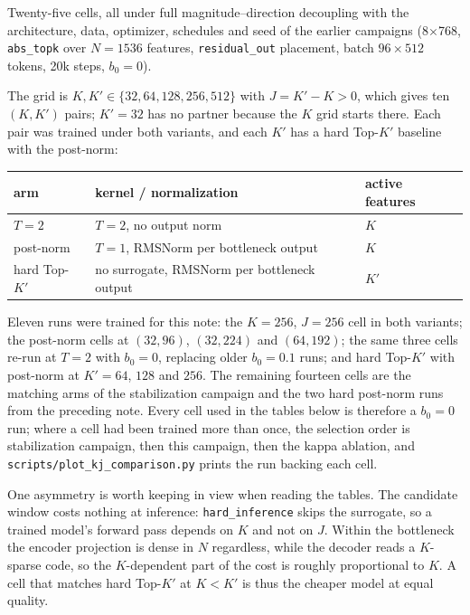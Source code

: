 \documentclass[11pt,a4paper]{article}
\newcommand{\code}[1]{\texttt{#1}}
\newcommand{\Kp}{K'}
\begin{document}
Twenty-five cells, all under full magnitude--direction decoupling with the
architecture, data, optimizer, schedules and seed of the earlier campaigns
(8$\times$768, \code{abs\_topk} over $N=1536$ features, \code{residual\_out}
placement, batch $96\times512$ tokens, 20k steps, $b_0=0$).

The grid is $K, \Kp \in \{32, 64, 128, 256, 512\}$ with $J = \Kp - K > 0$,
which gives ten $(K,\Kp)$ pairs; $\Kp = 32$ has no partner because the $K$
grid starts there. Each pair was trained under both variants, and each
$\Kp$ has a hard Top-$\Kp$ baseline with the post-norm:

\begin{center}\small
\begin{tabular}{lll}
\toprule
arm & kernel / normalization & active features \\
\midrule
$T=2$              & $T=2$, no output norm        & $K$ \\
post-norm          & $T=1$, RMSNorm per bottleneck output & $K$ \\
hard Top-$\Kp$     & no surrogate, RMSNorm per bottleneck output & $\Kp$ \\
\bottomrule
\end{tabular}
\end{center}

Eleven runs were trained for this note: the $K=256$, $J=256$ cell in both
variants; the post-norm cells at $(32,96)$, $(32,224)$ and $(64,192)$; the
same three cells re-run at $T=2$ with $b_0 = 0$, replacing older $b_0 = 0.1$
runs; and hard Top-$\Kp$ with post-norm at $\Kp = 64$, $128$ and $256$. The
remaining fourteen cells are the matching arms of the stabilization campaign
and the two hard post-norm runs from the preceding note. Every cell used in
the tables below is therefore a $b_0 = 0$ run; where a cell had been trained
more than once, the selection order is stabilization campaign, then this
campaign, then the kappa ablation, and \code{scripts/plot\_kj\_comparison.py}
prints the run backing each cell.

One asymmetry is worth keeping in view when reading the tables. The candidate
window costs nothing at inference: \code{hard\_inference} skips the surrogate,
so a trained model's forward pass depends on $K$ and not on $J$. Within the
bottleneck the encoder projection is dense in $N$ regardless, while the
decoder reads a $K$-sparse code, so the $K$-dependent part of the cost is
roughly proportional to $K$. A cell that matches hard Top-$\Kp$ at $K < \Kp$
is thus the cheaper model at equal quality.
\end{document}
